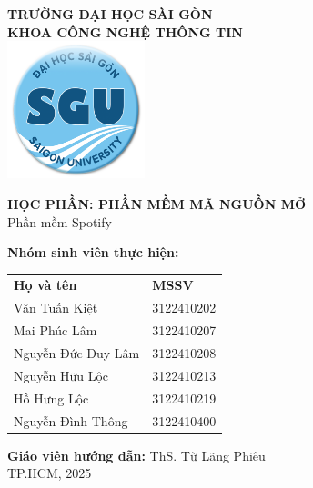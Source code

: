 \begin{titlepage}
    \centering
    
    {\LARGE \textbf{TRƯỜNG ĐẠI HỌC SÀI GÒN}} \\[0.2cm]
    {\Large \textbf{KHOA CÔNG NGHỆ THÔNG TIN}} \\[0.5cm]
    
    \vspace{0.5cm} 
    \includegraphics[width=4cm]{imgs/logo.png} %
    
    \vspace{0.5cm} %
    
    {\huge \textbf{HỌC PHẦN: PHẦN MỀM MÃ NGUỒN MỞ}} \\[0.5cm]
    {\Large Phần mềm Spotify} \\[0.5cm]

    \vspace{0.5cm} %
    
    \textbf{Nhóm sinh viên thực hiện:} \\[0.5cm]
    
    \begin{tabular}{l l}  %
        \textbf{Họ và tên} & \textbf{MSSV} \\[0.5cm]
        
        Văn Tuấn Kiệt & 3122410202 \\[0.2cm]
        Mai Phúc Lâm & 3122410207 \\[0.2cm]
        Nguyễn Đức Duy Lâm & 3122410208 \\[0.2cm]
        Nguyễn Hữu Lộc & 3122410213 \\[0.2cm]
        Hồ Hưng Lộc & 3122410219 \\[0.2cm]
        Nguyễn Đình Thông & 3122410400 \\[0.2cm]
    \end{tabular}

    \vspace{0.5cm}

    \textbf{Giáo viên hướng dẫn:} ThS. Từ Lãng Phiêu \\[0.5cm]
    
    \vfill
    {\Large TP.HCM, 2025}
\end{titlepage}
